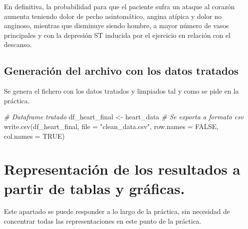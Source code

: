 \documentclass[
]{article}
\newenvironment{Shaded}{\begin{snugshade}}{\end{snugshade}}
\newcommand{\AttributeTok}[1]{\textcolor[rgb]{0.77,0.63,0.00}{#1}}
\newcommand{\CommentTok}[1]{\textcolor[rgb]{0.56,0.35,0.01}{\textit{#1}}}
\newcommand{\ConstantTok}[1]{\textcolor[rgb]{0.00,0.00,0.00}{#1}}
\newcommand{\FunctionTok}[1]{\textcolor[rgb]{0.00,0.00,0.00}{#1}}
\newcommand{\NormalTok}[1]{#1}
\newcommand{\OtherTok}[1]{\textcolor[rgb]{0.56,0.35,0.01}{#1}}
\newcommand{\StringTok}[1]{\textcolor[rgb]{0.31,0.60,0.02}{#1}}
\begin{document}
En definitiva, la probabilidad para que el paciente sufra un ataque al
corazón aumenta teniendo dolor de pecho asintomático, angina atípica y
dolor no anginoso, mientras que disminuye siendo hombre, a mayor número
de vasos principales y con la depresión ST inducida por el ejercicio en
relación con el descanso.

\hypertarget{generaciuxf3n-del-archivo-con-los-datos-tratados}{%
\subsection{Generación del archivo con los datos
tratados}\label{generaciuxf3n-del-archivo-con-los-datos-tratados}}

Se genera el fichero con los datos tratados y limpiados tal y como se
pide en la práctica.

\begin{Shaded}
\begin{Highlighting}[]
\CommentTok{\# Dataframe tratado}
\NormalTok{df\_heart\_final }\OtherTok{\textless{}{-}}\NormalTok{ heart\_data}
\CommentTok{\# Se exporta a formato csv}
\FunctionTok{write.csv}\NormalTok{(df\_heart\_final, }\AttributeTok{file =} \StringTok{"clean\_data.csv"}\NormalTok{, }\AttributeTok{row.names =} \ConstantTok{FALSE}\NormalTok{, }\AttributeTok{col.names =} \ConstantTok{TRUE}\NormalTok{)}
\end{Highlighting}
\end{Shaded}

\hypertarget{representaciuxf3n-de-los-resultados-a-partir-de-tablas-y-gruxe1ficas.}{%
\section{Representación de los resultados a partir de tablas y
gráficas.}\label{representaciuxf3n-de-los-resultados-a-partir-de-tablas-y-gruxe1ficas.}}

Este apartado se puede responder a lo largo de la práctica, sin
necesidad de concentrar todas las representaciones en este punto de la
práctica.
\end{document}
